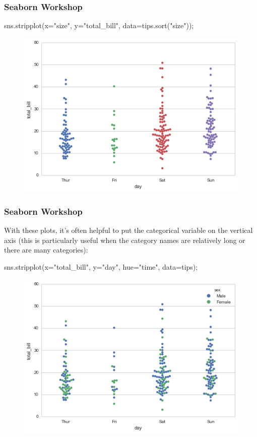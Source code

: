 \documentclass{beamer}
\begin{document}
\begin{frame}[fragile]
	\frametitle{Seaborn Workshop}
	\large
sns.stripplot(x="size", y="total_bill", data=tips.sort("size"));
\begin{figure}
	\centering
	\includegraphics[width=0.7\linewidth]{images/categorical_13_0}
\end{figure}
\end{frame}
\begin{frame}[fragile]
\frametitle{Seaborn Workshop}
\large
With these plots, it’s often helpful to put the categorical variable on the vertical axis (this is particularly useful when the category names are relatively long or there are many categories):

sns.stripplot(x="total_bill", y="day", hue="time", data=tips);
\begin{figure}
	\centering
	\includegraphics[width=0.7\linewidth]{images/categorical_15_0}
\end{figure}
\end{frame}
\end{document}
